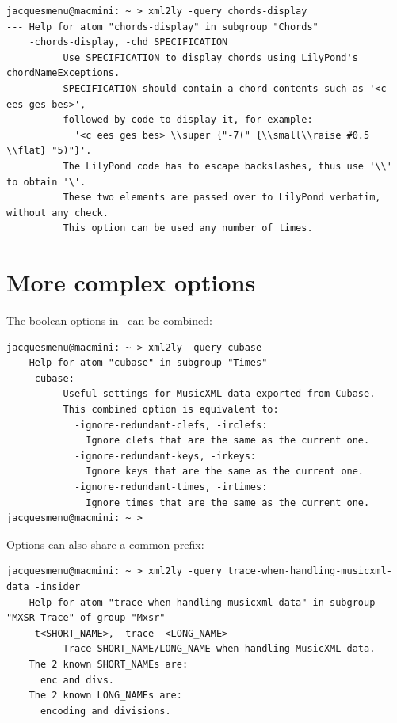 \begin{lstlisting}[language=Terminal]
jacquesmenu@macmini: ~ > xml2ly -query chords-display
--- Help for atom "chords-display" in subgroup "Chords"
    -chords-display, -chd SPECIFICATION
          Use SPECIFICATION to display chords using LilyPond's chordNameExceptions.
          SPECIFICATION should contain a chord contents such as '<c ees ges bes>',
          followed by code to display it, for example:
            '<c ees ges bes> \\super {"-7(" {\\small\\raise #0.5 \\flat} "5)"}'.
          The LilyPond code has to escape backslashes, thus use '\\' to obtain '\'.
          These two elements are passed over to LilyPond verbatim, without any check.
          This option can be used any number of times.
\end{lstlisting}


\section{More complex options}

The boolean options in \mf\ can be combined:
\begin{lstlisting}[language=Terminal]
jacquesmenu@macmini: ~ > xml2ly -query cubase
--- Help for atom "cubase" in subgroup "Times"
    -cubase:
          Useful settings for MusicXML data exported from Cubase.
          This combined option is equivalent to:
            -ignore-redundant-clefs, -irclefs:
              Ignore clefs that are the same as the current one.
            -ignore-redundant-keys, -irkeys:
              Ignore keys that are the same as the current one.
            -ignore-redundant-times, -irtimes:
              Ignore times that are the same as the current one.
jacquesmenu@macmini: ~ >
\end{lstlisting}

Options can also share a common prefix:
\begin{lstlisting}[language=Terminal]
jacquesmenu@macmini: ~ > xml2ly -query trace-when-handling-musicxml-data -insider
--- Help for atom "trace-when-handling-musicxml-data" in subgroup "MXSR Trace" of group "Mxsr" ---
    -t<SHORT_NAME>, -trace--<LONG_NAME>
          Trace SHORT_NAME/LONG_NAME when handling MusicXML data.
    The 2 known SHORT_NAMEs are:
      enc and divs.
    The 2 known LONG_NAMEs are:
      encoding and divisions.
\end{lstlisting}

